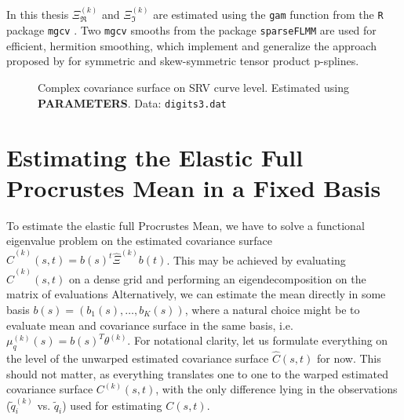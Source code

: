 In this thesis  $\Xi^{(k)}_\Re$ and $\Xi^{(k)}_\Im$ are estimated using the \texttt{gam} function from the \texttt{R} package \texttt{mgcv} \parencite{Wood2017}.
Two \texttt{mgcv} smooths from the package \texttt{sparseFLMM} \parencite{sparseFLMM} are used for efficient, hermition smoothing, which implement and generalize the approach proposed by \cite{CederbaumScheiplGreven2018} for symmetric and skew-symmetric tensor product p-splines.

\begin{figure}
  \centering
  \begin{subfigure}{.48\textwidth}
    \centering
  \end{subfigure}\hfill%
  \begin{subfigure}{.48\textwidth}
    \centering
  \end{subfigure}
  \caption{Complex covariance surface on SRV curve level. Estimated using \textbf{PARAMETERS}. Data: \texttt{digits3.dat}}
  \label{fig:3-cov}
\end{figure}


\section{Estimating the Elastic Full Procrustes Mean in a Fixed Basis}
\label{sec:3-mean}
To estimate the elastic full Procrustes Mean, we have to solve a functional eigenvalue problem on the estimated covariance surface $\hat{C}^{(k)}(s,t) = b(s)^t \hat\Xi^{(k)} b(t)$.
This may be achieved by evaluating $\hat{C}^{(k)}(s,t)$ on a dense grid and performing an eigendecomposition on the matrix of evaluations 
Alternatively, we can estimate the mean directly in some basis $b(s) = (b_1(s),\dots,b_K(s))$, where a natural choice might be to evaluate mean and covariance surface in the same basis, i.e. $\mu^{(k)}_q(s) = b(s)^T \theta^{(k)}$.
For notational clarity, let us formulate everything on the level of the unwarped estimated covariance surface $\hat{C}(s,t)$ for now.
This should not matter, as everything translates one to one to the warped estimated covariance surface $C^{(k)}(s,t)$, with the only difference lying in the observations ($\widetilde q^{(k)}_i$ vs. $\widetilde q_i$) used for estimating $C(s,t)$.

